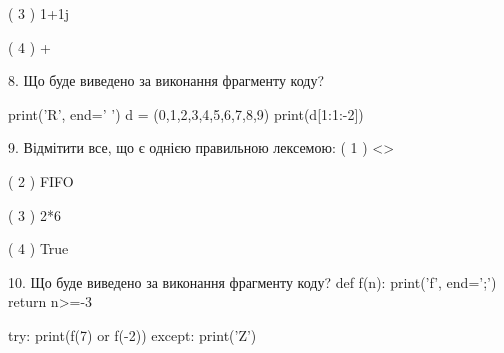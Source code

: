 \documentclass[11pt]{article}
\begin{document}
( 3 ) 1+1j

( 4 ) +


8. Що буде виведено за виконання фрагменту коду?

print('R', end=' ')
d = (0,1,2,3,4,5,6,7,8,9)
print(d[1:1:-2])



9. %
Відмітити все, що є однією правильною лексемою:
( 1 ) <>

( 2 ) FIFO

( 3 ) 2*6

( 4 ) True


10. Що буде виведено за виконання фрагменту коду?
def f(n):
    print('f', end=';')
    return n>=-3

try:
    print(f(7) or f(-2))
except:
    print('Z')


\newpage
\end{document}
